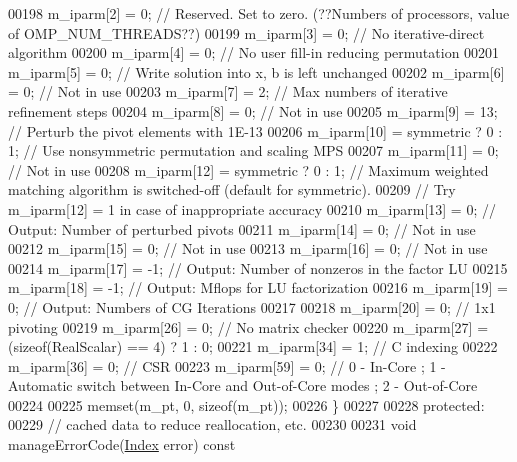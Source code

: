 \begin{DoxyCode}
00198       m\_iparm[2] = 0;   \textcolor{comment}{// Reserved. Set to zero. (??Numbers of processors, value of OMP\_NUM\_THREADS??)}
00199       m\_iparm[3] = 0;   \textcolor{comment}{// No iterative-direct algorithm}
00200       m\_iparm[4] = 0;   \textcolor{comment}{// No user fill-in reducing permutation}
00201       m\_iparm[5] = 0;   \textcolor{comment}{// Write solution into x, b is left unchanged}
00202       m\_iparm[6] = 0;   \textcolor{comment}{// Not in use}
00203       m\_iparm[7] = 2;   \textcolor{comment}{// Max numbers of iterative refinement steps}
00204       m\_iparm[8] = 0;   \textcolor{comment}{// Not in use}
00205       m\_iparm[9] = 13;  \textcolor{comment}{// Perturb the pivot elements with 1E-13}
00206       m\_iparm[10] = symmetric ? 0 : 1; \textcolor{comment}{// Use nonsymmetric permutation and scaling MPS}
00207       m\_iparm[11] = 0;  \textcolor{comment}{// Not in use}
00208       m\_iparm[12] = symmetric ? 0 : 1;  \textcolor{comment}{// Maximum weighted matching algorithm is switched-off (default for
       symmetric).}
00209                                         \textcolor{comment}{// Try m\_iparm[12] = 1 in case of inappropriate accuracy}
00210       m\_iparm[13] = 0;  \textcolor{comment}{// Output: Number of perturbed pivots}
00211       m\_iparm[14] = 0;  \textcolor{comment}{// Not in use}
00212       m\_iparm[15] = 0;  \textcolor{comment}{// Not in use}
00213       m\_iparm[16] = 0;  \textcolor{comment}{// Not in use}
00214       m\_iparm[17] = -1; \textcolor{comment}{// Output: Number of nonzeros in the factor LU}
00215       m\_iparm[18] = -1; \textcolor{comment}{// Output: Mflops for LU factorization}
00216       m\_iparm[19] = 0;  \textcolor{comment}{// Output: Numbers of CG Iterations}
00217       
00218       m\_iparm[20] = 0;  \textcolor{comment}{// 1x1 pivoting}
00219       m\_iparm[26] = 0;  \textcolor{comment}{// No matrix checker}
00220       m\_iparm[27] = (\textcolor{keyword}{sizeof}(RealScalar) == 4) ? 1 : 0;
00221       m\_iparm[34] = 1;  \textcolor{comment}{// C indexing}
00222       m\_iparm[36] = 0;  \textcolor{comment}{// CSR}
00223       m\_iparm[59] = 0;  \textcolor{comment}{// 0 - In-Core ; 1 - Automatic switch between In-Core and Out-of-Core modes ; 2 -
       Out-of-Core}
00224       
00225       memset(m\_pt, 0, \textcolor{keyword}{sizeof}(m\_pt));
00226     \}
00227 
00228   \textcolor{keyword}{protected}:
00229     \textcolor{comment}{// cached data to reduce reallocation, etc.}
00230     
00231     \textcolor{keywordtype}{void} manageErrorCode(\hyperlink{namespace_eigen_a62e77e0933482dafde8fe197d9a2cfde}{Index} error)\textcolor{keyword}{ const}

\end{DoxyCode}
